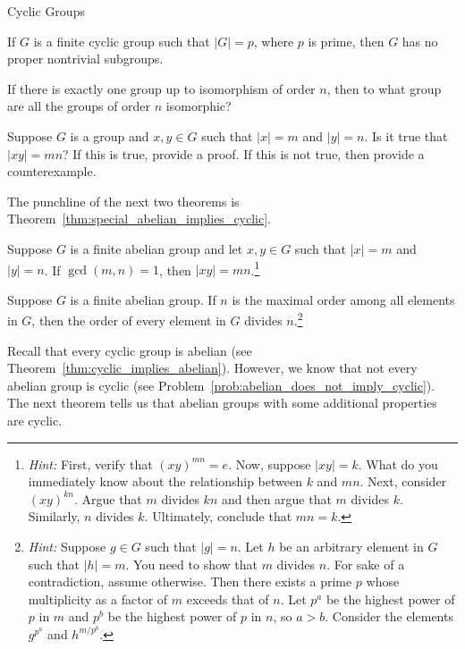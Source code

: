 \begin{section}{Cyclic Groups}
\begin{corollary}
If $G$ is a finite cyclic group such that $|G|=p$, where $p$ is prime, then $G$ has no proper nontrivial subgroups.
\end{corollary}

\begin{problem}
If there is exactly one group up to isomorphism of order $n$, then to what group are all the groups of order $n$ isomorphic?
\end{problem}

\begin{problem}
Suppose $G$ is a group and $x,y\in G$ such that $|x|=m$ and $|y|=n$. Is it true that $|xy|=mn$?  If this is true, provide a proof.  If this is not true, then provide a counterexample.
\end{problem}

The punchline of the next two theorems is Theorem~\ref{thm:special_abelian_implies_cyclic}.

\begin{theorem}
Suppose $G$ is a finite abelian group and let $x,y\in G$ such that $|x|=m$ and $|y|=n$. If $\gcd(m,n)=1$, then $|xy|=mn$.\footnote{\emph{Hint:} First, verify that $(xy)^{mn}=e$. Now, suppose $|xy|=k$. What do you immediately know about the relationship between $k$ and $mn$. Next, consider $(xy)^{kn}$. Argue that $m$ divides $kn$ and then argue that $m$ divides $k$. Similarly, $n$ divides $k$. Ultimately, conclude that $mn=k$.}
\end{theorem}

\begin{theorem}
Suppose $G$ is a finite abelian group. If $n$ is the maximal order among all elements in $G$, then the order of every element in $G$ divides $n$.\footnote{\emph{Hint:} Suppose $g\in G$ such that $|g|=n$. Let $h$ be an arbitrary element in $G$ such that $|h|=m$. You need to show that $m$ divides $n$. For sake of a contradiction, assume otherwise. Then there exists a prime $p$ whose multiplicity as a factor of $m$ exceeds that of $n$. Let $p^a$ be the highest power of $p$ in $m$ and $p^b$ be the highest power of $p$ in $n$, so $a>b$. Consider the elements $g^{p^a}$ and $h^{m/p^b}$.}
\end{theorem}

Recall that every cyclic group is abelian (see Theorem~\ref{thm:cyclic_implies_abelian}).  However, we know that not every abelian group is cyclic (see Problem~\ref{prob:abelian_does_not_imply_cyclic}).  The next theorem tells us that abelian groups with some additional properties are cyclic.


\end{section}

